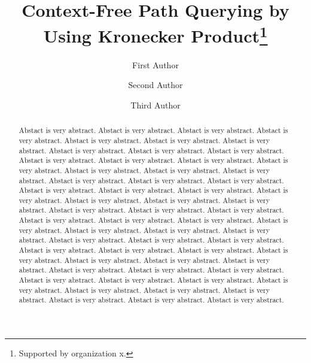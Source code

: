 \documentclass[runningheads,table]{llncs}
\begin{document}
%
\title{Context-Free Path Querying by Using Kronecker Product\thanks{Supported by organization x.}}
%
%
\author{First Author \and
Second Author \and
Third Author}
%
%
%
\maketitle              %
%
\begin{abstract}
Abstact is very abstract. Abstact is very abstract. Abstact is very abstract. Abstact is very abstract. Abstact is very abstract. Abstact is very abstract.
Abstact is very abstract. Abstact is very abstract. Abstact is very abstract. Abstact is very abstract. Abstact is very abstract. Abstact is very abstract.
Abstact is very abstract. Abstact is very abstract. Abstact is very abstract. Abstact is very abstract. Abstact is very abstract. Abstact is very abstract.
Abstact is very abstract. Abstact is very abstract. Abstact is very abstract. Abstact is very abstract. Abstact is very abstract. Abstact is very abstract.
Abstact is very abstract. Abstact is very abstract. Abstact is very abstract. Abstact is very abstract. Abstact is very abstract. Abstact is very abstract.
Abstact is very abstract. Abstact is very abstract. Abstact is very abstract. Abstact is very abstract. Abstact is very abstract. Abstact is very abstract.
Abstact is very abstract. Abstact is very abstract. Abstact is very abstract. Abstact is very abstract. Abstact is very abstract. Abstact is very abstract.
Abstact is very abstract. Abstact is very abstract. Abstact is very abstract. Abstact is very abstract. Abstact is very abstract. Abstact is very abstract.
Abstact is very abstract. Abstact is very abstract. Abstact is very abstract. Abstact is very abstract. Abstact is very abstract. Abstact is very abstract.
Abstact is very abstract. Abstact is very abstract. Abstact is very abstract. Abstact is very abstract. Abstact is very abstract. Abstact is very abstract.


\end{abstract}
%
%
%
\end{document}
